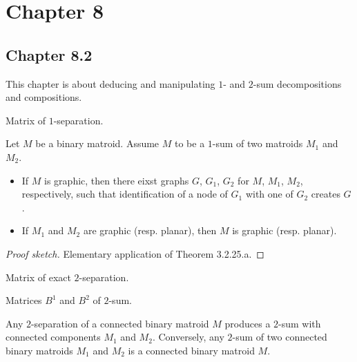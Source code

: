 \section{Chapter 8}

\subsection{Chapter 8.2}

This chapter is about deducing and manipulating $1$- and $2$-sum decompositions and compositions.

\begin{proposition}[8.2.1] %
  \label{prop:8.2.1}
  Matrix of $1$-separation.
\end{proposition}

\begin{lemma}[8.2.2]
  \label{lem:8.2.2}
  Let $M$ be a binary matroid. Assume $M$ to be a $1$-sum of two matroids $M_{1}$ and $M_{2}$.
  \begin{itemize}
    \item If $M$ is graphic, then there eixst graphs $G$, $G_{1}$, $G_{2}$ for $M$, $M_{1}$, $M_{2}$, respectively, such that identification of a node of $G_{1}$ with one of $G_{2}$ creates $G$.
    \item If $M_{1}$ and $M_{2}$ are graphic (resp. planar), then $M$ is graphic (resp. planar).
  \end{itemize}
\end{lemma}

\begin{proof}[Proof sketch]
  Elementary application of Theorem 3.2.25.a.
\end{proof}

\begin{proposition}[8.2.3]
  \label{prop:8.2.3}
  Matrix of exact $2$-separation.
\end{proposition}

\begin{proposition}[8.2.4] %
  \label{prop:8.2.4}
  Matrices $B^{1}$ and $B^{2}$ of $2$-sum.
\end{proposition}

\begin{lemma}[8.2.6]
  \label{lem:8.2.6}
  Any $2$-separation of a connected binary matroid $M$ produces a $2$-sum with connected components $M_{1}$ and $M_{2}$.
  Conversely, any $2$-sum of two connected binary matroids $M_{1}$ and $M_{2}$ is a connected binary matroid $M$.
\end{lemma}

